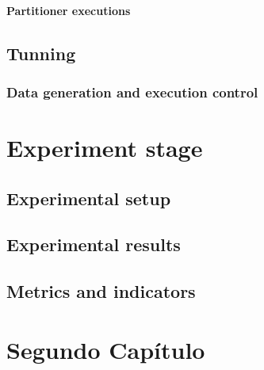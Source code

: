 \documentclass{iccmemoria}
\begin{document}
\subsubsection{Partitioner executions}
\section{Tunning}
\subsection{Data generation and execution control}


\chapter{Experiment stage}
\section{Experimental setup}
\section{Experimental results}
\section{Metrics and indicators}


\chapter{Segundo Capítulo}


\end{document}
